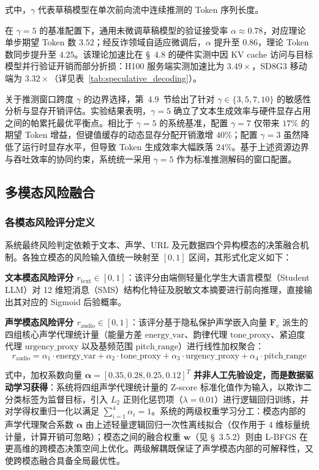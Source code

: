 \documentclass[11pt, a4paper]{article}
\begin{document}
式中，$\gamma$ 代表草稿模型在单次前向流中连续推测的 Token 序列长度。

在 $\gamma = 5$ 的基准配置下，通用未微调草稿模型的验证接受率 $\alpha \approx 0.78$，对应理论单步期望 Token 数 $3.52$；经反诈领域自适应微调后，$\alpha$ 提升至 $0.86$，理论 Token 数同步提升至 $4.25$。该理论加速比在 \S~4.8 的硬件实测中因 KV cache 访问与目标模型并行验证开销而部分折损：H100 服务端实测加速比为 $3.49\times$，SD8G3 移动端为 $3.32\times$（详见表~\ref{tab:speculative_decoding}）。

关于推测窗口跨度 $\gamma$ 的边界选择，第~4.9~节给出了针对 $\gamma \in \{3,5,7,10\}$ 的敏感性分析与显存开销评估。实验结果表明，$\gamma=5$ 确立了文本生成效率与硬件显存占用之间的帕累托最优平衡点。相比于 $\gamma=5$ 的系统基准，配置 $\gamma=7$ 仅带来 $17\%$ 的期望 Token 增益，但键值缓存的动态显存分配开销激增 $40\%$；配置 $\gamma=3$ 虽然降低了运行时显存水平，但导致 Token 生成效率大幅跌落 $24\%$。基于上述资源边界与吞吐效率的协同约束，系统统一采用 $\gamma=5$ 作为标准推测解码的窗口配置。

\subsection{多模态风险融合}
\subsubsection{各模态风险评分定义}

系统最终风险判定依赖于文本、声学、URL 及元数据四个异构模态的决策融合机制。各独立模态的风险输入值统一映射至 $[0,1]$ 区间，其形式化定义如下：

\textbf{文本模态风险评分 $r_{\mathrm{text}} \in [0,1]$}：该评分由端侧轻量化学生大语言模型（Student LLM）对 12 维短消息（SMS）结构化特征及脱敏文本摘要进行前向推理，直接输出其对应的 Sigmoid 后验概率。

\textbf{声学模态风险评分 $r_{\mathrm{audio}} \in [0,1]$}：该评分基于隐私保护声学嵌入向量 $\bm{F}_v$ 派生的四组核心声学代理统计量（能量方差 $\text{energy\_var}$、韵律代理 $\text{tone\_proxy}$、紧迫度代理 $\text{urgency\_proxy}$ 以及基频范围 $\text{pitch\_range}$）进行线性加权聚合：
    \begin{equation}
    \label{eq:voice_risk}
        r_{\mathrm{audio}} = \alpha_1 \cdot \text{energy\_var} + \alpha_2 \cdot \text{tone\_proxy} + \alpha_3 \cdot \text{urgency\_proxy} + \alpha_4 \cdot \text{pitch\_range}
    \end{equation}
    
式中，加权系数向量 $\bm{\alpha} = [0.35, 0.28, 0.25, 0.12]^T$ \textbf{并非人工先验设定，而是数据驱动学习获得}：系统将四组声学代理统计量的 Z-score 标准化值作为输入，以欺诈二分类标签为监督目标，引入 $L_2$ 正则化惩罚项（$\lambda = 0.01$）进行逻辑回归训练，并对学得权重归一化以满足 $\sum_{i=1}^4 \alpha_i = 1$。系统的两级权重学习分工：模态内部的声学代理聚合系数 $\bm{\alpha}$ 由上述轻量逻辑回归一次性离线拟合（仅作用于 4 维标量统计量，计算开销可忽略）；模态之间的融合权重 $\mathbf{w}$（见 \S~3.5.2）则由 L-BFGS 在更高维的跨模态决策空间上优化。两级解耦既保证了声学模态内部的可解释性，又使跨模态融合具备全局最优性。
\end{document}
